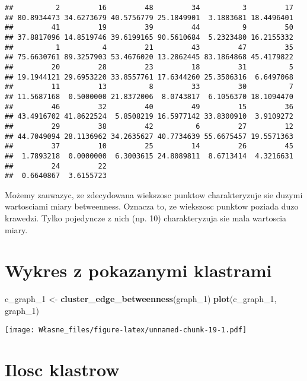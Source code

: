 \documentclass[]{article}
\newenvironment{Shaded}{\begin{snugshade}}{\end{snugshade}}
\newcommand{\KeywordTok}[1]{\textcolor[rgb]{0.13,0.29,0.53}{\textbf{#1}}}
\newcommand{\DecValTok}[1]{\textcolor[rgb]{0.00,0.00,0.81}{#1}}
\newcommand{\StringTok}[1]{\textcolor[rgb]{0.31,0.60,0.02}{#1}}
\newcommand{\NormalTok}[1]{#1}
\begin{document}
\begin{verbatim}
##          2         16         48         34          3         17 
## 80.8934473 34.6273679 40.5756779 25.1849901  3.1883681 18.4496401 
##         41         19         39         44          9         50 
## 37.8817096 14.8519746 39.6199165 90.5610684  5.2323480 16.2155332 
##          1          4         21         43         47         35 
## 75.6630761 89.3257903 53.4676020 13.2862445 83.1864868 45.4179822 
##         20         28         23         18         31          5 
## 19.1944121 29.6953220 33.8557761 17.6344260 25.3506316  6.6497068 
##         11         13          8         33         30          7 
## 11.5687168  0.5000000 21.8372006  8.0743817  6.1056370 18.1094470 
##         46         32         40         49         15         36 
## 43.4916702 41.8622524  5.8508219 16.5977142 33.8300910  3.9109272 
##         29         38         42          6         27         12 
## 44.7049094 28.1136962 34.2635627 40.7734639 55.6675457 19.5571363 
##         37         10         25         14         26         45 
##  1.7893218  0.0000000  6.3003615 24.8089811  8.6713414  4.3216631 
##         24         22 
##  0.6640867  3.6155723
\end{verbatim}

Możemy zauwazyc, ze zdecydowana wiekszosc punktow charakteryzuje sie
duzymi wartosciami miary betweenness. Oznacza to, ze wiekszosc punktow
poziada duzo krawedzi. Tylko pojedyncze z nich (np. 10) charakteryzuja
sie mala wartoscia miary.

\section{Wykres z pokazanymi
klastrami}\label{wykres-z-pokazanymi-klastrami}

\begin{Shaded}
\begin{Highlighting}[]
\NormalTok{c_graph_}\DecValTok{1}\NormalTok{ <-}\StringTok{ }\KeywordTok{cluster_edge_betweenness}\NormalTok{(graph_}\DecValTok{1}\NormalTok{)}
\KeywordTok{plot}\NormalTok{(c_graph_}\DecValTok{1}\NormalTok{, graph_}\DecValTok{1}\NormalTok{)}
\end{Highlighting}
\end{Shaded}

\texttt{[image: Własne\_files/figure-latex/unnamed-chunk-19-1.pdf]}

\section{Ilosc klastrow}\label{ilosc-klastrow}
\end{document}
